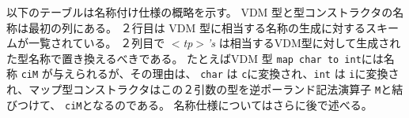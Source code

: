 \documentclass[\pformat,12pt]{jarticle}
\begin{document}
%
%
%
%

以下のテーブルは名称付け仕様の概略を示す。
VDM 型と型コンストラクタの名称は最初の列にある。
２行目は VDM 型に相当する名称の生成に対するスキームが一覧されている。
２列目で {\em $<$tp$>$'s} は相当するVDM型に対して生成された型名称で置き換えるべきである。
たとえばVDM 型 \verb+map char to int+には名称 \verb+ciM+ が与えられるが、その理由は、 \verb+char+ は \verb+c+に変換され、\verb+int+ は \verb+i+に変換され、マップ型コンストラクタはこの２引数の型を逆ポーランド記法演算子 \verb+M+と結びつけて、 \verb+ciM+となるのである。 
名称仕様についてはさらに後で述べる。
\end{document}
